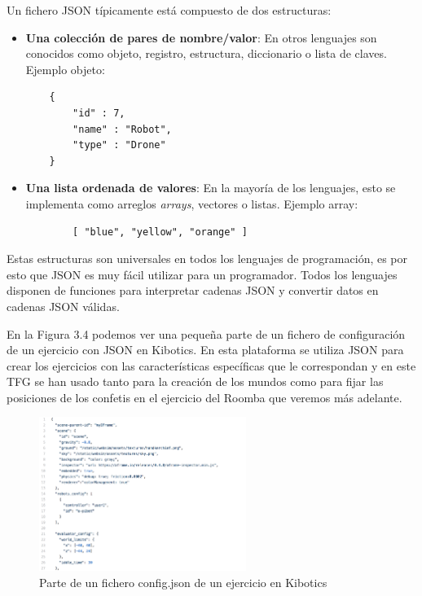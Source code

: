 Un fichero JSON  típicamente está compuesto de dos estructuras: 
\begin{itemize}
    \item \textbf{Una colección de pares de nombre/valor}: En otros lenguajes son conocidos como objeto, registro, estructura, diccionario o lista de claves. 
    Ejemplo objeto: 
    \begin{lstlisting}
    {
        "id" : 7,
        "name" : "Robot",
        "type" : "Drone"
    }
     \end{lstlisting}
    \item \textbf{Una lista ordenada de valores}: En la mayoría de los lenguajes, esto se implementa como arreglos \textit{arrays}, vectores o listas.  
     Ejemplo array:  
     \begin{lstlisting}
        [ "blue", "yellow", "orange" ]
     \end{lstlisting}
\end{itemize}

Estas estructuras son universales en todos los lenguajes de programación, es por esto que  JSON es muy fácil utilizar para un programador. Todos los lenguajes disponen de funciones para interpretar cadenas JSON y convertir datos en cadenas JSON válidas.

En la Figura 3.4 podemos ver una pequeña parte de un fichero de configuración de un ejercicio con JSON en Kibotics. En esta plataforma se utiliza JSON para crear los ejercicios con las características específicas que le correspondan y en este TFG se han usado tanto para la creación de los mundos como para fijar las posiciones de los confetis en el ejercicio del Roomba que veremos más adelante.

\begin{figure}[H]
    \centering
    \includegraphics[width=0.6\textwidth, height=0.4\textwidth]{chapters/images/json.png}
    \caption{Parte de un fichero config.json de un ejercicio en Kibotics}
    \label{fig:my_label}
\end{figure}

